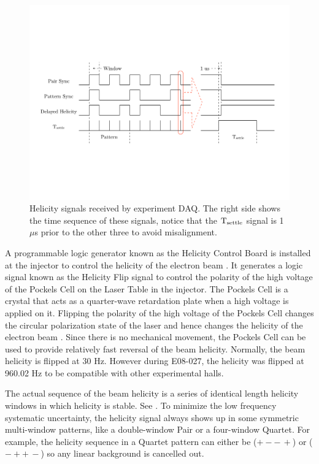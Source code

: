 \begin{figure}[b!]
  \centering
  \includegraphics[width=\textwidth]{figs/helicity-signal.pdf}
  \caption[Helicity signals received by experiment DAQ.]{Helicity signals received by experiment DAQ. The right side shows the time sequence of these signals, notice that the $\mathrm{T}_{\mathrm{settle}}$ signal is 1 $\mu$s prior to the other three to avoid misalignment. \label{C5S1SS2F1}}
\end{figure}

A programmable logic generator known as the Helicity Control Board is installed at the injector to control the helicity of the electron beam \cite{Flood2010}. It generates a logic signal known as the Helicity Flip signal to control the polarity of the high voltage of the Pockels Cell on the Laser Table in the injector. The Pockels Cell is a crystal that acts as a quarter-wave retardation plate when a high voltage is applied on it. Flipping the polarity of the high voltage of the Pockels Cell changes the circular polarization state of the laser and hence changes the helicity of the electron beam \cite{Hansknecht2007}. Since there is no mechanical movement, the Pockels Cell can be used to provide relatively fast reversal of the beam helicity. Normally, the beam helicity is flipped at 30 Hz. However during E08-027, the helicity was flipped at 960.02 Hz to be compatible with other experimental halls.

The actual sequence of the beam helicity is a series of identical length helicity windows in which helicity is stable. See . To minimize the low frequency systematic uncertainty, the helicity signal always shows up in some symmetric multi-window patterns, like a double-window Pair or a four-window Quartet. For example, the helicity sequence in a Quartet pattern can either be ($+--\,+$) or ($-++\,-$) so any linear background is cancelled out.

